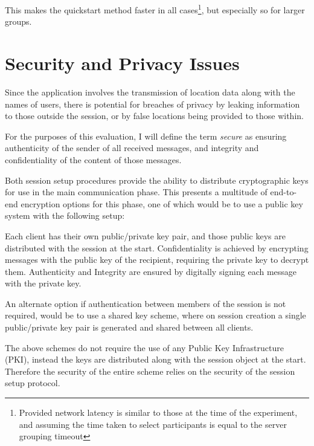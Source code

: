 This makes the quickstart method faster in all cases\footnote{Provided network latency is similar to those at the time of the experiment, and assuming the time taken to select participants is equal to the server grouping timeout}, but especially so for larger groups.

\section{Security and Privacy Issues}
\label{security}

Since the application involves the transmission of location data along with the names of users, there is potential for breaches of privacy by leaking information to those outside the session, or by false locations being provided to those within.

For the purposes of this evaluation, I will define the term \emph{secure} as ensuring authenticity of the sender of all received messages, and integrity and confidentiality of the content of those messages.

Both session setup procedures provide the ability to distribute cryptographic keys for use in the main communication phase. This presents a multitude of end-to-end encryption options for this phase, one of which would be to use a public key system with the following setup:

Each client has their own public/private key pair, and those public keys are distributed with the session at the start. Confidentiality is achieved by encrypting messages with the public key of the recipient, requiring the private key to decrypt them. Authenticity and Integrity are ensured by digitally signing each message with the private key.

An alternate option if authentication between members of the session is not required, would be to use a shared key scheme, where on session creation a single public/private key pair is generated and shared between all clients.

The above schemes do not require the use of any Public Key Infrastructure (PKI), instead the keys are distributed along with the session object at the start. Therefore the security of the entire scheme relies on the security of the session setup protocol.

